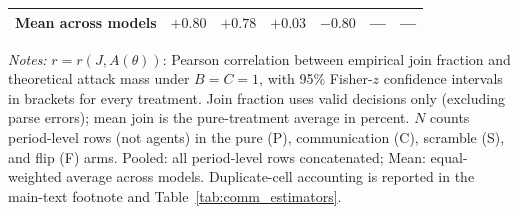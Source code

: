\begin{table}[t]
{\begin{tabular}{lcccccc}
\textbf{Mean across models} & $+0.80$ & $+0.78$ & $+0.03$ & $-0.80$ & --- & --- \\
\bottomrule
\end{tabular}
}
\begin{tablenotes}
\footnotesize\emph{Notes:} $r = r(J, A(\theta))$: Pearson correlation between empirical join fraction and theoretical attack mass under $B = C = 1$, with 95\% Fisher-$z$ confidence intervals in brackets for every treatment. Join fraction uses valid decisions only (excluding parse errors); mean join is the pure-treatment average in percent. $N$ counts period-level rows (not agents) in the pure (P), communication (C), scramble (S), and flip (F) arms. Pooled: all period-level rows concatenated; Mean: equal-weighted average across models. Duplicate-cell accounting is reported in the main-text footnote and Table~\ref{tab:comm_estimators}.
\end{tablenotes}
\end{table}
